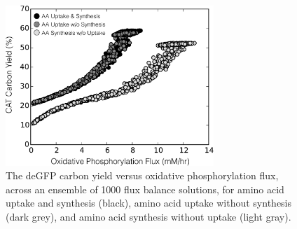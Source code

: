 \documentclass[journal=asbcd6,manuscript=article]{achemso}
\begin{document}
\begin{figure}[t!]
\includegraphics[width=0.7\textwidth]{./figs/Fig-4-OxyPhox-versus-Carbon-Yield.pdf}
\caption{The deGFP carbon yield versus oxidative phosphorylation flux, across an ensemble of 1000 flux balance solutions, for amino acid uptake and synthesis (black), amino acid uptake without synthesis (dark grey), and amino acid synthesis without uptake (light gray).}
\label{fig:oxphos_yield}
\end{figure}
\end{document}
